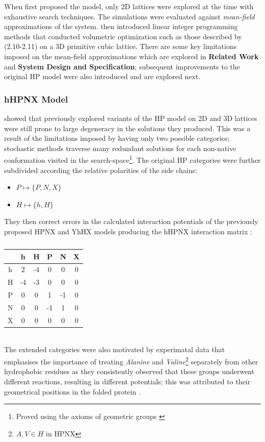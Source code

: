 When \cite{Lau1989} first proposed the model, only 2D lattices were explored at the time with
exhaustive search techniques. The simulations were evaluated
against \emph{mean-field} approximations of the system. \cite{Yue} then introduced linear integer programming methods
that conducted volumetric optimization such as those described by (2.10-2.11) 
on a 3D primitive cubic lattice. There are some key limitations imposed on the mean-field
approximations which are explored in \textbf{Related Work} and \textbf{System Design and Specification};
subsequent improvements to the original HP model were also introduced and are explored next.

\subsubsection{hHPNX Model}
\cite{Hoque} showed that previously explored variants of the HP model on 2D and 3D
lattices were still prone to large degeneracy in the solutions they produced. This was
a result of the limitations imposed by having only two possible categories; stochastic
methods traverse many redundant solutions for each non-native conformation visited
in the search-space\footnote{Proved using the axioms of geometric groups \cite{Conway1988}}.
The original HP categories were further subdivided according the relative polarities of
the side chains:
\begin{itemize}
    \item $P \mapsto \{P, N, X\}$ 
    \item $H \mapsto \{h, H\}$
\end{itemize}
They then correct errors in the calculated interaction potentials
of the previously proposed HPNX and YhHX models \cite{BornbergBauer1997} producing
the hHPNX interaction matrix :
\begin{table}[!htb]
    \begin{center}
        \caption{}
        \begin{tabular}{|c || c | c | c | c | c|}
            \hline
             & h & H & P & N & X \\
            \hline
            h & 2 & -4 & 0 & 0 & 0 \\
            \hline
            H & -4 & -3 & 0 & 0 & 0 \\
            \hline
            P & 0 & 0 & 1 & -1 & 0\\
            \hline
            N & 0 & 0 & -1 & 1 & 0\\
            \hline
            X & 0 & 0 & 0 & 0 & 0\\ 
            \hline
        \end{tabular}
    \end{center}
\end{table}\\
The extended categories were also motivated by experimatal data that
emphasises the importance of treating \emph{Alanine} and \emph{Valine}\footnote{$A, V \in H$ in HPNX}
separately from other hydrophobic residues as they consistently observed
that these groups underwent different reactions, resulting in different potentials;
this was attributed to their geometrical positions in the folded protein \cite{Crippen1991}.\\


